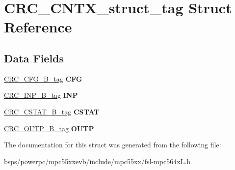 \hypertarget{structCRC__CNTX__struct__tag}{}\section{C\+R\+C\+\_\+\+C\+N\+T\+X\+\_\+struct\+\_\+tag Struct Reference}
\label{structCRC__CNTX__struct__tag}
\subsection*{Data Fields}
\begin{DoxyCompactItemize}
\item 
\mbox{\label{structCRC__CNTX__struct__tag_a878a4c635c1ad06f270cef6a33c965ec}} 
\mbox{\hyperlink{unionCRC__CFG__32B__tag}{C\+R\+C\+\_\+\+C\+F\+G\+\_\+B\+\_\+tag}} {\bfseries C\+FG}
\item 
\mbox{\label{structCRC__CNTX__struct__tag_acf6b79603799a7ecfcdbd3076a18d968}} 
\mbox{\hyperlink{unionCRC__INP__32B__tag}{C\+R\+C\+\_\+\+I\+N\+P\+\_\+B\+\_\+tag}} {\bfseries I\+NP}
\item 
\mbox{\label{structCRC__CNTX__struct__tag_a2040288fc1362a90be8ed797e0dda41b}} 
\mbox{\hyperlink{unionCRC__CSTAT__32B__tag}{C\+R\+C\+\_\+\+C\+S\+T\+A\+T\+\_\+B\+\_\+tag}} {\bfseries C\+S\+T\+AT}
\item 
\mbox{\label{structCRC__CNTX__struct__tag_a783ec18e6fa32b4799943debc60aa7d2}} 
\mbox{\hyperlink{unionCRC__OUTP__32B__tag}{C\+R\+C\+\_\+\+O\+U\+T\+P\+\_\+B\+\_\+tag}} {\bfseries O\+U\+TP}
\end{DoxyCompactItemize}


The documentation for this struct was generated from the following file\+:\begin{DoxyCompactItemize}
\item 
bsps/powerpc/mpc55xxevb/include/mpc55xx/fsl-\/mpc564x\+L.\+h\end{DoxyCompactItemize}
